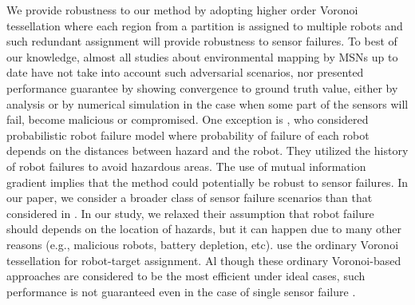 \documentclass[letterpaper, 10 pt, conference]{ieeeconf}
\begin{document}
We provide robustness to our method by adopting higher order Voronoi tessellation \cite{shamos1975closest} where each region from a partition is assigned to multiple robots and such redundant assignment will provide robustness to sensor failures. To best of our knowledge, almost all studies about environmental mapping by MSNs up to date have not take into account such adversarial scenarios, nor presented performance guarantee by showing convergence to ground truth value, either by analysis or by numerical simulation in the case when some part of the sensors will fail, become malicious or compromised. One exception is \cite{schwager2017multi}, who considered probabilistic robot failure model where probability of failure of each robot depends on the distances between hazard and the robot. They utilized the history of robot failures to avoid hazardous areas. The use of mutual information gradient implies that the method could potentially be robust to sensor failures. In our paper, we consider a broader class of sensor failure scenarios than that considered in \cite{schwager2017multi}. In our study, we relaxed their assumption that robot failure should depends on the location of hazards, but it can happen due to many other reasons (e.g., malicious robots, battery depletion, etc). \cite{cortez2011information} use the ordinary Voronoi tessellation for robot-target assignment. Al though these ordinary Voronoi-based approaches are considered to be the most efficient under ideal cases, such performance is not guaranteed even in the case of single sensor failure \cite{hutchinson_robust_2012}.




%
%
\end{document}
